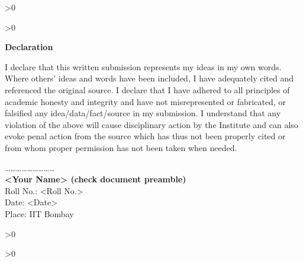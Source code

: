 \documentclass[12pt, a4paper
,openany
]{Thesis} %
\newcounter{print}
\def\authornames{<Your Name> (check document preamble)}
\def\authorrollno{<Roll No.>}
\newcommand\myemptypage{
    \newpage
    \null
    \pagestyle{empty}
    \newpage
    \pagestyle{plain}
    }
\begin{document}
\ifnum \value{print}>0 {\myemptypage} \else {\clearpage} \fi

\ifnum \value{print}>0 {\setcounter{page}{5}} \fi


{ %

\begin{center}
    \textbf{\LARGE {Declaration}}
\end{center}}
\vspace*{0.1in}
I declare that this written submission represents my ideas in my own words. Where others' ideas and words have been included, I have adequately cited and referenced the original source. I declare that I have adhered to all principles of academic honesty and integrity and have not misrepresented or fabricated, or falsified any idea/data/fact/source in my submission. I understand that any violation of the above will cause disciplinary action by the Institute and can also evoke penal action from the source which has thus not been properly cited or from whom proper permission has not been taken when needed.

\bigskip
\bigskip
\bigskip
\bigskip


\vspace*{2.5cm} %
\begin{flushleft}
\ldots \ldots \ldots \ldots \ldots \ldots \ldots \ldots \ldots\\
\vspace{2mm}
\textbf{\authornames} \\
Roll No.: \authorrollno \\
Date: <Date>\\
Place: IIT Bombay
\end{flushleft}

\ifnum \value{print}>0 {\myemptypage} \else {\clearpage} \fi


\ifnum \value{print}>0 {\setcounter{page}{7}} \fi

\thispagestyle{plain}
\thispagestyle{plain}
\clearpage
\end{document}
